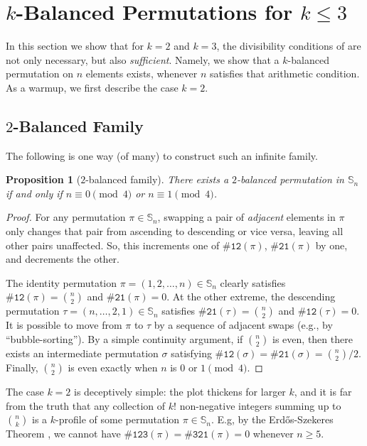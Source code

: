 \documentclass{article}
\newtheorem{proposition}[theorem]{Proposition}
\newcommand{\twob}{$2$-balanced\xspace}
\newcommand{\Sn}{\mathbb{S}_n}
\newcommand{\pc}[2]{{\# \mathtt{ #1 } \left( #2 \right)}}
\newcommand{\ESZ}{Erd\H{o}s-Szekeres\xspace}
\theoremstyle{remark}
\theoremstyle{plain}
\begin{document}
 \section{\texorpdfstring{$k$}{k}-Balanced Permutations for \texorpdfstring{$k\le3$}{k<=3}}
\label{section:3balanced_construction}

In this section we show that for $k=2$ and $k=3$, the  divisibility conditions 
of  are not only necessary, but also \emph{sufficient}.
Namely, we show that a $k$-balanced permutation on $n$ elements 
exists, whenever $n$ satisfies that arithmetic condition.
As a warmup, we first describe the case $k=2$.

\subsection{\texorpdfstring{$2$}{2}-Balanced Family}
\label{subsect:2bal_construction}

The following is one way (of many) to construct such an infinite family.

\begin{proposition}[$2$-balanced family]
There exists a \twob permutation in $\Sn$ if and only if 
\mbox{$n\equiv 0 \pmod 4$} or $n\equiv 1 \pmod 4$.
\end{proposition}

\begin{proof}
For any permutation $\pi \in \Sn$, swapping a pair of \emph{adjacent} elements in $\pi$ only changes that pair from ascending to descending or vice versa, leaving all other pairs unaffected. So, this increments one of $\pc{12}{\pi}$, $\pc{21}{\pi}$ by one, and decrements the other.

The identity permutation $\pi=(1,2,\dots, n) \in \Sn$ clearly satisfies
$\pc{12}{\pi}=\binom{n}{2}$ and $\pc{21}{\pi}=0$. At the other extreme,
the descending permutation $\tau = (n, \dots, 2, 1) \in \Sn$
satisfies $\pc{21}{\tau}=\binom{n}{2}$ and $\pc{12}{\tau}=0$.
It is possible to move from $\pi$ to $\tau$ by
a sequence of adjacent swaps (e.g., by ``bubble-sorting''). 
By a simple continuity argument, if $\binom{n}{2}$ is even, then there exists an intermediate permutation $\sigma$ satisfying $\pc{12}{\sigma} = \pc{21}{\sigma} = \binom{n}{2} / 2$. Finally, $\binom{n}{2}$ is even exactly when $n$ is $0$ or $1 \pmod 4$.
\end{proof}

The case $k=2$ is deceptively simple: the plot thickens for larger $k$, and
it is far from the truth that 
any collection of $k!$ non-negative integers summing up to $\binom{n}{k}$ is a $k$-profile of some permutation $\pi \in \Sn$. E.g, by the \ESZ Theorem \cite{erdos1935combinatorial}, we cannot have $\pc{123}{\pi}=\pc{321}{\pi}=0$ whenever $n\geq 5$. 
\end{document}
